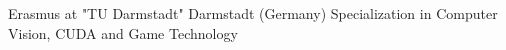 \documentclass[letterpaper]{twentysecondcv} %
\begin{document}
\begin{twenty}
	{Erasmus at "TU Darmstadt"\footnotemarkA[2]} {Darmstadt (Germany)}
	{Specialization in Computer Vision, CUDA and Game Technology}
\end{twenty}











\end{document}
